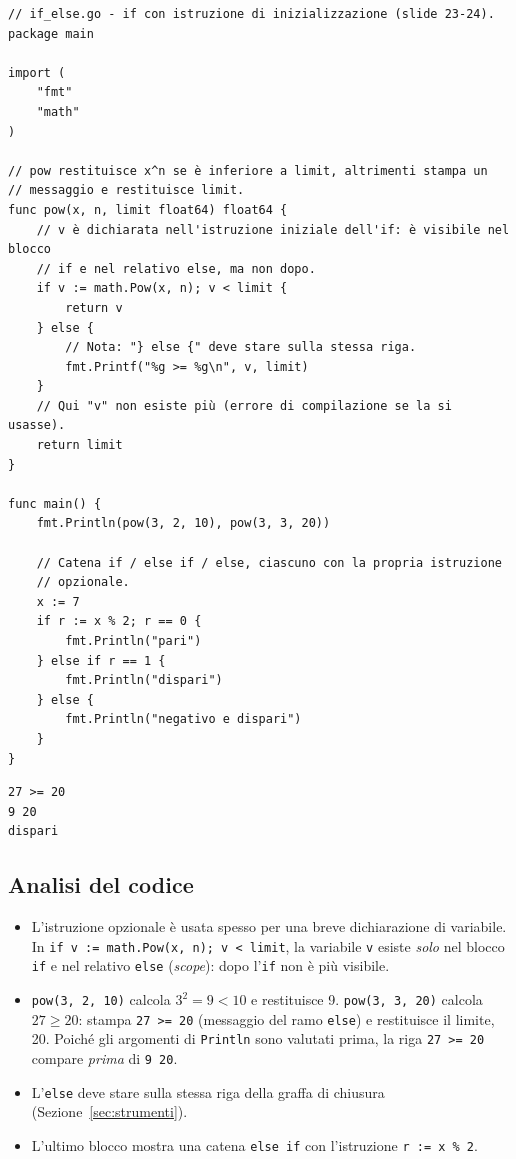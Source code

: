\documentclass[11pt,a4paper]{report}
\newcommand{\cod}[1]{\texttt{#1}}
\begin{document}
\begin{lstlisting}[style=gocode,caption={\texttt{03\_control\_flow/if\_else.go}}]
// if_else.go - if con istruzione di inizializzazione (slide 23-24).
package main

import (
	"fmt"
	"math"
)

// pow restituisce x^n se è inferiore a limit, altrimenti stampa un
// messaggio e restituisce limit.
func pow(x, n, limit float64) float64 {
	// v è dichiarata nell'istruzione iniziale dell'if: è visibile nel blocco
	// if e nel relativo else, ma non dopo.
	if v := math.Pow(x, n); v < limit {
		return v
	} else {
		// Nota: "} else {" deve stare sulla stessa riga.
		fmt.Printf("%g >= %g\n", v, limit)
	}
	// Qui "v" non esiste più (errore di compilazione se la si usasse).
	return limit
}

func main() {
	fmt.Println(pow(3, 2, 10), pow(3, 3, 20))

	// Catena if / else if / else, ciascuno con la propria istruzione
	// opzionale.
	x := 7
	if r := x % 2; r == 0 {
		fmt.Println("pari")
	} else if r == 1 {
		fmt.Println("dispari")
	} else {
		fmt.Println("negativo e dispari")
	}
}
\end{lstlisting}
\begin{lstlisting}[style=output]
27 >= 20
9 20
dispari
\end{lstlisting}

\subsection{Analisi del codice}

\begin{itemize}
  \item L'istruzione opzionale è usata spesso per una breve dichiarazione di
        variabile. In \cod{if v := math.Pow(x, n); v < limit}, la variabile
        \cod{v} esiste \emph{solo} nel blocco \cod{if} e nel relativo
        \cod{else} (\emph{scope}): dopo l'\cod{if} non è più visibile.
  \item \cod{pow(3, 2, 10)} calcola $3^2=9<10$ e restituisce 9. \cod{pow(3, 3,
        20)} calcola $27\ge 20$: stampa \cod{27 >= 20} (messaggio del ramo
        \cod{else}) e restituisce il limite, 20. Poiché gli argomenti di
        \cod{Println} sono valutati prima, la riga \cod{27 >= 20} compare
        \emph{prima} di \cod{9 20}.
  \item L'\cod{else} deve stare sulla stessa riga della graffa di chiusura
        (Sezione~\ref{sec:strumenti}).
  \item L'ultimo blocco mostra una catena \cod{else if} con l'istruzione
        \cod{r := x \% 2}.
\end{itemize}
\end{document}
